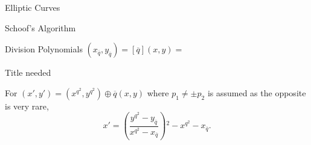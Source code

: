 \documentclass[12pt, letterpaper]{article}
\begin{document}
\begin{section}{Elliptic Curves}
\begin{subsection}{Schoof's Algorithm}
\begin{subsubsection}{Division Polynomials}
      \((x_{\overline{q}}, y_{\overline{q}}) = [\overline{q}](x, y) = \)

    \end{subsubsection}

    \begin{subsubsection}{Title needed}

      For \((x', y') = (x^{q^{2}}, y^{q^{2}}) \oplus \overline{q}(x, y)\) where
      \(p_{1} \neq \pm p_{2}\) is assumed as the opposite is very rare,
      \[x' = \left ( \frac{y^{q^{2}} - y_{\overline{q}}}{x^{q^{2}} -
            x_{\overline{q}}} \right ){}^{2} - x^{q^{2}} - x_{\overline{q}}.\]

    \end{subsubsection}

  \end{subsection}

\end{section}

\newpage
\end{document}
